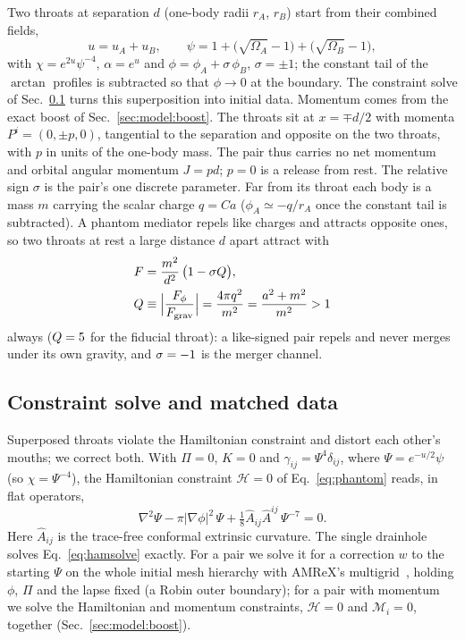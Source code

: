 \documentclass[twocolumn,floatfix,aps,prd,superscriptaddress,nofootinbib,showkeys]{revtex4-2}
\begin{document}
Two throats at separation $d$ (one-body radii $r_A$, $r_B$) start from their combined fields,
\begin{equation}
u = u_A + u_B,\qquad
\psi = 1 + \bigl(\sqrt{\Omega_A}-1\bigr) + \bigl(\sqrt{\Omega_B}-1\bigr),
\end{equation}
with $\chi = e^{2u}\psi^{-4}$, $\alpha = e^{u}$ and $\phi = \phi_A + \sigma\,\phi_B$, $\sigma=\pm1$; the constant tail of the $\arctan$ profiles is subtracted so that $\phi\to0$ at the boundary. The constraint solve of Sec.~\ref{sec:model:solve} turns this superposition into initial data. Momentum comes from the exact boost of Sec.~\ref{sec:model:boost}. The throats sit at $x=\mp d/2$ with momenta $P^i=(0,\pm p,0)$, tangential to the separation and opposite on the two throats, with $p$ in units of the one-body mass. The pair thus carries no net momentum and orbital angular momentum $J=pd$; $p=0$ is a release from rest. The relative sign $\sigma$ is the pair's one discrete parameter. Far from its throat each body is a mass $m$ carrying the scalar charge $q=Ca$ ($\phi_A\simeq-q/r_A$ once the constant tail is subtracted). A phantom mediator repels like charges and attracts opposite ones, so two throats at rest a large distance $d$ apart attract with
\begin{equation}
\begin{split}
F&=\frac{m^2}{d^2}\,\bigl(1-\sigma Q\bigr),\\
Q&\equiv\Bigl|\frac{F_\phi}{F_{\rm grav}}\Bigr|=\frac{4\pi q^2}{m^2}=\frac{a^2+m^2}{m^2}>1
\end{split}
\label{eq:force}
\end{equation}
always ($Q=5$ for the fiducial throat): a like-signed pair repels and never merges under its own gravity, and $\sigma=-1$ is the merger channel.

\subsection{Constraint solve and matched data}
\label{sec:model:solve}

Superposed throats violate the Hamiltonian constraint and distort each other's mouths; we correct both. With $\Pi=0$, $K=0$ and $\gamma_{ij}=\Psi^4\delta_{ij}$, where $\Psi=e^{-u/2}\psi$ (so $\chi=\Psi^{-4}$), the Hamiltonian constraint $\mathcal H=0$ of Eq.~\eqref{eq:phantom} reads, in flat operators,
\begin{equation}
\nabla^2\Psi-\pi|\nabla\phi|^2\,\Psi+\tfrac18\hat A_{ij}\hat A^{ij}\,\Psi^{-7}=0 .
\label{eq:hamsolve}
\end{equation}
Here $\hat A_{ij}$ is the trace-free conformal extrinsic curvature. The single drainhole solves Eq.~\eqref{eq:hamsolve} exactly. For a pair we solve it for a correction $w$ to the starting $\Psi$ on the whole initial mesh hierarchy with AMReX's multigrid~\cite{amrex}, holding $\phi$, $\Pi$ and the lapse fixed (a Robin outer boundary); for a pair with momentum we solve the Hamiltonian and momentum constraints, $\mathcal H=0$ and $\mathcal M_i=0$, together (Sec.~\ref{sec:model:boost}).
\end{document}
